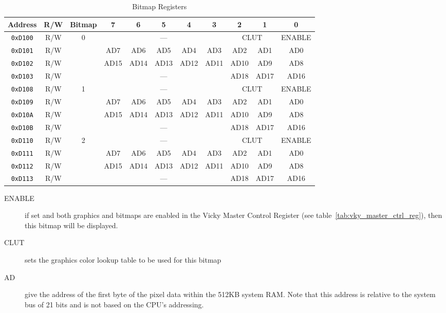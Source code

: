 \begin{table}[ht]
    \begin{center}
        \begin{tabular}{|c|c|c|c|c|c|c|c|c|c|c|} \hline
            Address & R/W & Bitmap & 7 & 6 & 5 & 4 & 3 & 2 & 1 & 0 \\ \hline\hline
            \verb+0xD100+ & R/W & \multirow{4}{*}{0} & \multicolumn{5}{|c|}{---} & \multicolumn{2}{|c|}{CLUT} & ENABLE \\\cline{1-2}\cline{4-11}
            \verb+0xD101+ & R/W & & AD7 & AD6 & AD5 & AD4 & AD3 & AD2 & AD1 & AD0 \\\cline{1-2}\cline{4-11}
            \verb+0xD102+ & R/W & & AD15 & AD14 & AD13 & AD12 & AD11 & AD10 & AD9 & AD8 \\\cline{1-2}\cline{4-11}
            \verb+0xD103+ & R/W & & \multicolumn{5}{|c|}{---} & AD18 & AD17 & AD16 \\ \hline

            \verb+0xD108+ & R/W & \multirow{4}{*}{1} & \multicolumn{5}{|c|}{---} & \multicolumn{2}{|c|}{CLUT} & ENABLE \\\cline{1-2}\cline{4-11}
            \verb+0xD109+ & R/W & & AD7 & AD6 & AD5 & AD4 & AD3 & AD2 & AD1 & AD0 \\\cline{1-2}\cline{4-11}
            \verb+0xD10A+ & R/W & & AD15 & AD14 & AD13 & AD12 & AD11 & AD10 & AD9 & AD8 \\\cline{1-2}\cline{4-11}
            \verb+0xD10B+ & R/W & & \multicolumn{5}{|c|}{---} & AD18 & AD17 & AD16 \\ \hline

            \verb+0xD110+ & R/W & \multirow{4}{*}{2} & \multicolumn{5}{|c|}{---} & \multicolumn{2}{|c|}{CLUT} & ENABLE \\\cline{1-2}\cline{4-11}
            \verb+0xD111+ & R/W & & AD7 & AD6 & AD5 & AD4 & AD3 & AD2 & AD1 & AD0 \\\cline{1-2}\cline{4-11}
            \verb+0xD112+ & R/W & & AD15 & AD14 & AD13 & AD12 & AD11 & AD10 & AD9 & AD8 \\\cline{1-2}\cline{4-11}
            \verb+0xD113+ & R/W & & \multicolumn{5}{|c|}{---} & AD18 & AD17 & AD16 \\ \hline
        \end{tabular}
    \end{center}
    \caption{Bitmap Registers}
    \label{tab:bm_registers}
\end{table}

\begin{description}
    \item[ENABLE] if set and both graphics and bitmaps are enabled in the Vicky Master Control Register (see table~\ref{tab:vky_master_ctrl_reg}), then this bitmap will be displayed.

    \item[CLUT] sets the graphics color lookup table to be used for this bitmap

    \item[AD] give the address of the first byte of the pixel data within the 512KB system RAM. Note that this address is relative to the system bus of 21 bits and is not based on the CPU's addressing.
\end{description}

